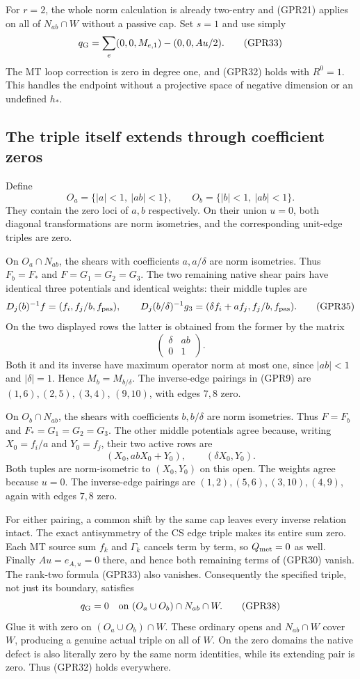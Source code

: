 For $r=2$, the whole norm calculation is already two-entry and
(GPR21) applies on all of $N_{ab}\cap W$ without a passive cap.
Set $s=1$ and use simply
\[
                   q_{\rm G}=\sum_e(0,0,M_{e,1})-(0,0,Au/2).
 \tag{GPR33}
\]
The MT loop correction is zero in degree one, and (GPR32) holds
with $R^0=1$.  This handles the endpoint without a projective
space of negative dimension or an undefined $h_*$.

\subsection{The triple itself extends through coefficient zeros}

Define
\[
 O_a=\{|a|<1,\ |ab|<1\},\qquad
 O_b=\{|b|<1,\ |ab|<1\}.
 \tag{GPR34}
\]
They contain the zero loci of $a,b$ respectively.  On their union
$u=0$, both diagonal transformations are norm isometries, and
the corresponding unit-edge triples are zero.

On $O_a\cap N_{ab}$, the shears with coefficients $a,a/\delta$
are norm isometries.  Thus $F_b=F_*$ and $F=G_1=G_2=G_3$.
The two remaining native shear pairs have identical three
potentials and identical weights: their middle tuples are
\[
 D_j(b)^{-1}f=(f_i,f_j/b,f_{\rm pas}),\qquad
 D_j(b/\delta)^{-1}g_3=(\delta f_i+a f_j,f_j/b,f_{\rm pas}).
 \tag{GPR35}
\]
On the two displayed rows the latter is obtained from the former
by the matrix
\[
                   \begin{pmatrix}\delta&ab\\0&1\end{pmatrix}.
 \tag{GPR36}
\]
Both it and its inverse have maximum operator norm at most one,
since $|ab|<1$ and $|\delta|=1$.  Hence $M_b=M_{b/\delta}$.
The inverse-edge pairings in (GPR9) are $(1,6),(2,5),(3,4)$,
$(9,10)$, with edges $7,8$ zero.

On $O_b\cap N_{ab}$, the shears with coefficients $b,b/\delta$
are norm isometries.  Thus $F=F_b$ and $F_*=G_1=G_2=G_3$.
The other middle potentials agree because, writing
$X_0=f_i/a$ and $Y_0=f_j$, their two active rows are
\[
               (X_0,abX_0+Y_0),\qquad(\delta X_0,Y_0).
 \tag{GPR37}
\]
Both tuples are norm-isometric to $(X_0,Y_0)$ on this open.
The weights agree because $u=0$.  The inverse-edge pairings are
$(1,2),(5,6),(3,10),(4,9)$, again with edges $7,8$ zero.

For either pairing, a common shift by the same cap leaves every
inverse relation intact.  The exact antisymmetry of the CS edge
triple makes its entire sum zero.  Each MT source sum $f_k$ and
$\Gamma_k$ cancels term by term, so $Q_{\rm met}=0$ as well.
Finally $Au=e_{A,u}=0$ there, and hence both remaining terms of
(GPR30) vanish.  The rank-two formula (GPR33) also vanishes.
Consequently the specified triple, not just its boundary, satisfies
\[
                   q_{\rm G}=0
              \quad\text{on }(O_a\cup O_b)\cap N_{ab}\cap W.
 \tag{GPR38}
\]
Glue it with zero on $(O_a\cup O_b)\cap W$.  These ordinary
opens and $N_{ab}\cap W$ cover $W$, producing a genuine actual
triple on all of $W$.  On the zero domains the native defect is
also literally zero by the same norm identities, while its
extending pair is zero.  Thus (GPR32) holds everywhere.

